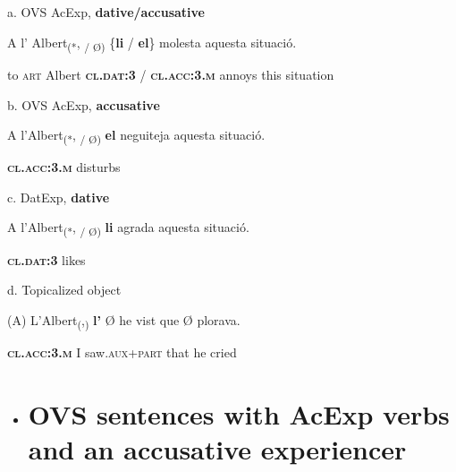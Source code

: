 \documentclass[output=paper,modfonts,nonflat]{langsci/langscibook}
\begin{document}
\ea%
    \label{ex:key:13}
    \gll\\
        \\
    \glt
    \z

         a. OVS AcExp, \textbf{dative/accusative}

           A l’     Albert\textsubscript{(*}, \textsubscript{/ Ø)} \{\textbf{li}              / \textbf{el}\}                molesta aquesta situació.

           to \textsc{art} Albert           \textbf{\textsc{cl.dat:3}} / \textbf{\textsc{cl.acc:3.m}} annoys  this       situation

       b. OVS AcExp, \textbf{accusative}

           A l’Albert\textsubscript{(*}, \textsubscript{/ Ø)} \textbf{el}                  neguiteja aquesta situació.

                                     \textbf{\textsc{cl.acc:3.m}} disturbs

       c. DatExp, \textbf{dative}

           A l’Albert\textsubscript{(*}, \textsubscript{/ Ø)} \textbf{li}              agrada aquesta situació.

                                    \textbf{\textsc{cl.dat:3}} likes

       d. Topicalized object

           (A)  L’Albert\textsubscript{(},\textsubscript{)} \textbf{l’}                 Ø he vist              que  Ø  plorava.

                                    \textbf{\textsc{cl.acc:3.m}} I saw.\textsc{aux+part} that he cried

\begin{itemize}
\item \section{OVS sentences with AcExp verbs and an accusative experiencer}
\end{itemize}
\end{document}
